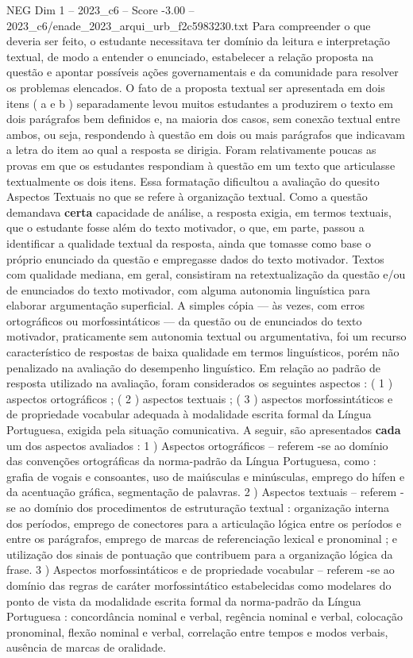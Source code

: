 \begin{textsample}{NEG Dim 1 – 2023\_c6 – Score -3.00 – 2023\_c6/enade\_2023\_arqui\_urb\_f2c5983230.txt}
Para compreender o que deveria ser feito, o estudante necessitava ter domínio da leitura e interpretação textual, de modo a entender o enunciado, estabelecer a relação proposta na questão e apontar possíveis ações governamentais e da comunidade para resolver os problemas elencados.
O fato de a proposta textual ser apresentada em dois itens ( a e b ) separadamente levou muitos estudantes a produzirem o texto em dois parágrafos bem definidos e, na maioria dos casos, sem conexão textual entre ambos, ou seja, respondendo à questão em dois ou mais parágrafos que indicavam a letra do item ao qual a resposta se dirigia.
Foram relativamente poucas as provas em que os estudantes respondiam à questão em um texto que articulasse textualmente os dois itens.
Essa formatação dificultou a avaliação do quesito Aspectos Textuais no que se refere à organização textual.
Como a questão demandava \textbf{certa} capacidade de análise, a resposta exigia, em termos textuais, que o estudante fosse além do texto motivador, o que, em parte, passou a identificar a qualidade textual da resposta, ainda que tomasse como base o próprio enunciado da questão e empregasse dados do texto motivador.
Textos com qualidade mediana, em geral, consistiram na retextualização da questão e/ou de enunciados do texto motivador, com alguma autonomia linguística para elaborar argumentação superficial.
A simples cópia — às vezes, com erros ortográficos ou morfossintáticos — da questão ou de enunciados do texto motivador, praticamente sem autonomia textual ou argumentativa, foi um recurso característico de respostas de baixa qualidade em termos linguísticos, porém não penalizado na avaliação do desempenho linguístico.
Em relação ao padrão de resposta utilizado na avaliação, foram considerados os seguintes aspectos : ( 1 ) aspectos ortográficos ; ( 2 ) aspectos textuais ; ( 3 ) aspectos morfossintáticos e de propriedade vocabular adequada à modalidade escrita formal da Língua Portuguesa, exigida pela situação comunicativa.
A seguir, são apresentados \textbf{cada} um dos aspectos avaliados : 1 ) Aspectos ortográficos – referem -se ao domínio das convenções ortográficas da norma-padrão da Língua Portuguesa, como : grafia de vogais e consoantes, uso de maiúsculas e minúsculas, emprego do hífen e da acentuação gráfica, segmentação de palavras. 2 ) Aspectos textuais – referem -se ao domínio dos procedimentos de estruturação textual : organização interna dos períodos, emprego de conectores para a articulação lógica entre os períodos e entre os parágrafos, emprego de marcas de referenciação lexical e pronominal ; e utilização dos sinais de pontuação que contribuem para a organização lógica da frase. 3 ) Aspectos morfossintáticos e de propriedade vocabular – referem -se ao domínio das regras de caráter morfossintático estabelecidas como modelares do ponto de vista da modalidade escrita formal da norma-padrão da Língua Portuguesa : concordância nominal e verbal, regência nominal e verbal, colocação pronominal, flexão nominal e verbal, correlação entre tempos e modos verbais, ausência de marcas de oralidade.

\end{textsample}
